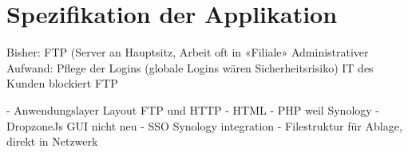 \chapter{Spezifikation der Applikation}

Bisher: FTP (Server an Hauptsitz, Arbeit oft in «Filiale»
Administrativer Aufwand: Pflege der Logins (globale Logins wären Sicherheitsrisiko)
IT des Kunden blockiert FTP


- Anwendungslayer Layout FTP und HTTP \cite[p.~26]{Zisler}
- HTML \cite[p.~174]{Butz}
- PHP weil Synology 
- DropzoneJs GUI nicht neu \cite{DropzoneJs}
- SSO Synology integration \cite{Synology}
- Filestruktur für Ablage, direkt in Netzwerk 

